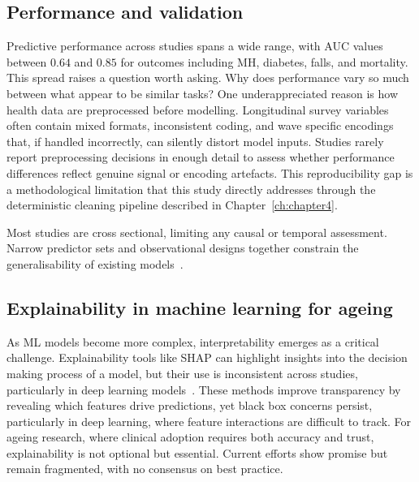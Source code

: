 \subsection{Performance and validation}
Predictive performance across studies spans a wide range, with \gls{AUC} values between $0.64$ and $0.85$ for outcomes including \gls{MH}, diabetes, falls, and mortality. This spread raises a question worth asking. Why does performance vary so much between what appear to be similar tasks? One underappreciated reason is how health data are preprocessed before modelling. Longitudinal survey variables often contain mixed formats, inconsistent coding, and wave specific encodings that, if handled incorrectly, can silently distort model inputs. Studies rarely report preprocessing decisions in enough detail to assess whether performance differences reflect genuine signal or encoding artefacts. This reproducibility gap is a methodological limitation that this study directly addresses through the deterministic cleaning pipeline described in Chapter~\ref{ch:chapter4}.

Most studies are cross sectional, limiting any causal or temporal assessment. Narrow predictor sets and observational designs together constrain the generalisability of existing models~\cite{xuTailoredMachineLearning2023}. %

\subsection{Explainability in machine learning for ageing}
As \gls{ML} models become more complex, interpretability emerges as a critical challenge. Explainability tools like \gls{SHAP} can highlight insights into the decision making process of a model, but their use is inconsistent across studies, particularly in deep learning models~\cite{xuTailoredMachineLearning2023,davisLinearRegressionbasedMachine2021,davisComparisonGaitSpeed2021}. 
These methods improve transparency by revealing which features drive predictions, yet black box concerns persist, particularly in deep learning, where feature interactions are difficult to track.
For ageing research, where clinical adoption requires both accuracy and trust, explainability is not optional but essential. 
Current efforts show promise but remain fragmented, with no consensus on best practice.

